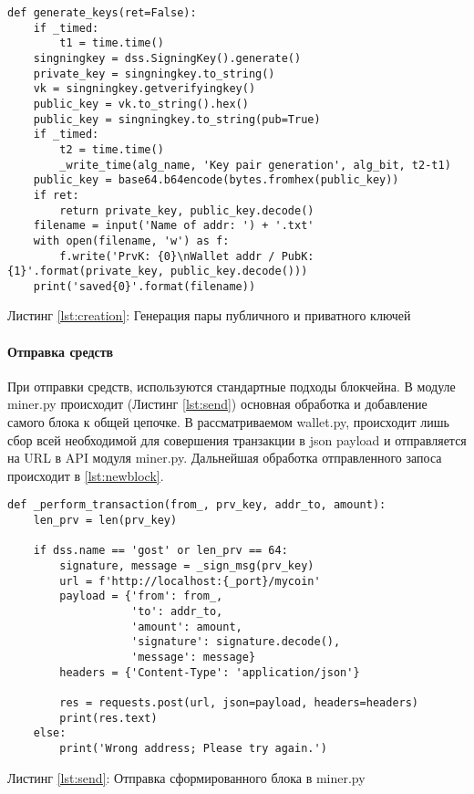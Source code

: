 \begin{center}
\begin{lstlisting}
def generate_keys(ret=False):
    if _timed:
        t1 = time.time()
    singningkey = dss.SigningKey().generate()
    private_key = singningkey.to_string()
    vk = singningkey.getverifyingkey()
    public_key = vk.to_string().hex()
    public_key = singningkey.to_string(pub=True)
    if _timed:
        t2 = time.time()
        _write_time(alg_name, 'Key pair generation', alg_bit, t2-t1)
    public_key = base64.b64encode(bytes.fromhex(public_key))
    if ret:
        return private_key, public_key.decode()
    filename = input('Name of addr: ') + '.txt'
    with open(filename, 'w') as f:
        f.write('PrvK: {0}\nWallet addr / PubK: {1}'.format(private_key, public_key.decode()))
    print('saved{0}'.format(filename))
\end{lstlisting}\label{lst:creation}
    Листинг \ref{lst:creation}: Генерация пары публичного и приватного ключей
\end{center}



\paragraph{Отправка средств}
При отправки средств, используются стандартные подходы блокчейна. В модуле
{\small miner.py} происходит (Листинг \ref{lst:send}) основная обработка и
добавление самого блока к общей цепочке. В рассматриваемом {\small wallet.py},
происходит лишь сбор всей необходимой для совершения транзакции в json payload
и отправляется на URL в API модуля {\small miner.py}. Дальнейшая обработка
отправленного запоса происходит в \ref{lst:newblock}.

\begin{center}
\begin{lstlisting}
def _perform_transaction(from_, prv_key, addr_to, amount):
    len_prv = len(prv_key)

    if dss.name == 'gost' or len_prv == 64:
        signature, message = _sign_msg(prv_key)
        url = f'http://localhost:{_port}/mycoin'
        payload = {'from': from_,
                   'to': addr_to,
                   'amount': amount,
                   'signature': signature.decode(),
                   'message': message}
        headers = {'Content-Type': 'application/json'}

        res = requests.post(url, json=payload, headers=headers)
        print(res.text)
    else:
        print('Wrong address; Please try again.')
\end{lstlisting}\label{lst:send}
    Листинг \ref{lst:send}: Отправка сформированного блока в {\small miner.py}
\end{center}


